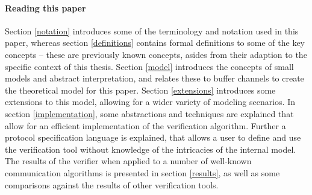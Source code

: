 \paragraph{Reading this paper} Section \ref{notation} introduces some of the terminology and notation used in this paper, whereas section \ref{definitions} contains formal definitions to some of the key concepts -- these are previously known concepts, asides from their adaption to the specific context of this thesis. Section \ref{model} introduces the concepts of small models and abstract interpretation, and relates these to buffer channels to create the theoretical model for this paper. Section \ref{extensions} introduces some extensions to this model, allowing for a wider variety of modeling scenarios. In section \ref{implementation}, some abstractions and techniques are explained that allow for an efficient implementation of the verification algorithm. Further a protocol specification language is explained, that allows a user to define and use the verification tool without knowledge of the intricacies of the internal model. The results of the verifier when applied to a number of well-known communication algorithms is presented in section \ref{results}, as well as some comparisons against the results of other verification tools.



